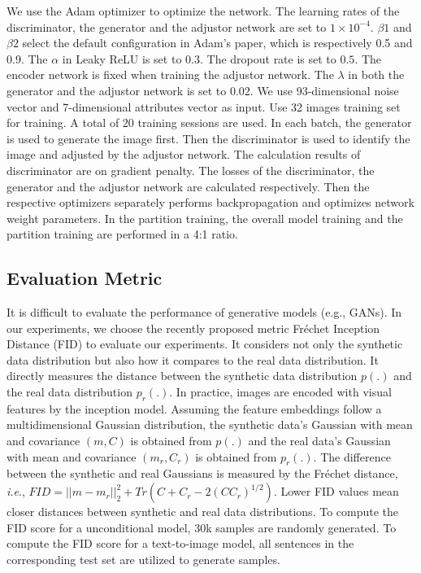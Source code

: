 We use the Adam optimizer to optimize the network.
The learning rates of the discriminator, the generator and the adjustor network are set to $1\times10^{-4}$.
$\beta1$ and $\beta2$ select the default configuration in Adam's paper, which is respectively 0.5 and 0.9.
The $\alpha$ in Leaky ReLU is set to $0.3$.
The dropout rate is set to $0.5$.
The encoder network is fixed when training the adjustor network.
The $\lambda$ in both the generator and the adjustor network is set to 0.02.
We use 93-dimensional noise vector and 7-dimensional attributes vector as input.
Use 32 images training set for training.
A total of 20 training sessions are used.
In each batch, the generator is used to generate the image first.
Then the discriminator is used to identify the image and adjusted by the adjustor network.
The calculation results of discriminator are on gradient penalty.
The losses of the discriminator, the generator and the adjustor network are calculated respectively. 
Then the respective optimizers separately performs backpropagation and optimizes network weight parameters.
In the partition training, the overall model training and the partition training are performed in a 4:1 ratio.

\subsection{Evaluation Metric}
It is difficult to evaluate the performance of generative models (e.g., GANs).
In our experiments, we choose the recently proposed metric Fr\'echet Inception Distance (FID) to evaluate our experiments.
It considers not only the synthetic data distribution but also how it compares to the real data distribution.
It directly measures the distance between the synthetic data distribution $p(.)$ and the real data distribution $p_r(.)$.
In practice, images are encoded with visual features by the inception model.
Assuming the feature embeddings follow a multidimensional Gaussian distribution,
    the synthetic data's Gaussian with mean and covariance $(m, C)$ is obtained from $p(.)$ and the real data's Gaussian with mean and covariance $(m_r, C_r)$ is obtained from $p_r(.)$.
The difference between the synthetic and real Gaussians is measured by the Fr\'echet distance, \emph{i.e}., $FID = ||m-m_r||_{2}^{2} + Tr\left(C + C_r - 2(CC_r)^{1/2}\right)$. Lower FID values mean closer distances between synthetic and real data distributions.
To compute the FID score for a unconditional model, 30k samples are randomly generated. To compute the FID score for a text-to-image model, all sentences in the corresponding test set are utilized to generate samples. 


